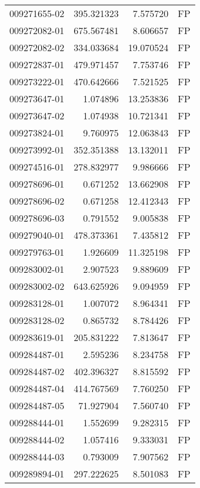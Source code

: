 \begin{tabular}{lrrl}
009271655-02 &  395.321323 &       7.575720 &   FP \\
009272082-01 &  675.567481 &       8.606657 &   FP \\
009272082-02 &  334.033684 &      19.070524 &   FP \\
009272837-01 &  479.971457 &       7.753746 &   FP \\
009273222-01 &  470.642666 &       7.521525 &   FP \\
009273647-01 &    1.074896 &      13.253836 &   FP \\
009273647-02 &    1.074938 &      10.721341 &   FP \\
009273824-01 &    9.760975 &      12.063843 &   FP \\
009273992-01 &  352.351388 &      13.132011 &   FP \\
009274516-01 &  278.832977 &       9.986666 &   FP \\
009278696-01 &    0.671252 &      13.662908 &   FP \\
009278696-02 &    0.671258 &      12.412343 &   FP \\
009278696-03 &    0.791552 &       9.005838 &   FP \\
009279040-01 &  478.373361 &       7.435812 &   FP \\
009279763-01 &    1.926609 &      11.325198 &   FP \\
009283002-01 &    2.907523 &       9.889609 &   FP \\
009283002-02 &  643.625926 &       9.094959 &   FP \\
009283128-01 &    1.007072 &       8.964341 &   FP \\
009283128-02 &    0.865732 &       8.784426 &   FP \\
009283619-01 &  205.831222 &       7.813647 &   FP \\
009284487-01 &    2.595236 &       8.234758 &   FP \\
009284487-02 &  402.396327 &       8.815592 &   FP \\
009284487-04 &  414.767569 &       7.760250 &   FP \\
009284487-05 &   71.927904 &       7.560740 &   FP \\
009288444-01 &    1.552699 &       9.282315 &   FP \\
009288444-02 &    1.057416 &       9.333031 &   FP \\
009288444-03 &    0.793009 &       7.907562 &   FP \\
009289894-01 &  297.222625 &       8.501083 &   FP \\

\end{tabular}
